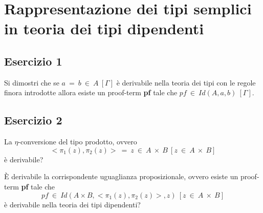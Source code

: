 \section{Rappresentazione dei tipi semplici in teoria dei tipi dipendenti}
\subsection{Esercizio 1}
\begin{thm}
	Si dimostri che se $a~=~b~\in~A~[\Gamma]$ è derivabile nella teoria dei tipi con le regole finora introdotte allora esiste un proof-term \textbf{pf} tale che $pf~\in~Id(A,a,b)~[\Gamma]$.
\end{thm}


\subsection{Esercizio 2}
\begin{thm}
	La $\eta$-conversione del tipo prodotto, ovvero
	\[<\pi_1(z),\pi_2(z)>~=~z~\in~A~\times~B~[z~\in~A~\times~B]\]
	è derivabile?
	
	È derivabile la corrispondente uguaglianza proposizionale, ovvero esiste un proof-term \textbf{pf} tale che
	\[pf~\in~Id(A\times B,<\pi_1(z),\pi_2(z)>,z)~[z~\in~A~\times~B]\]
	è derivabile nella teoria dei tipi dipendenti?
\end{thm}
